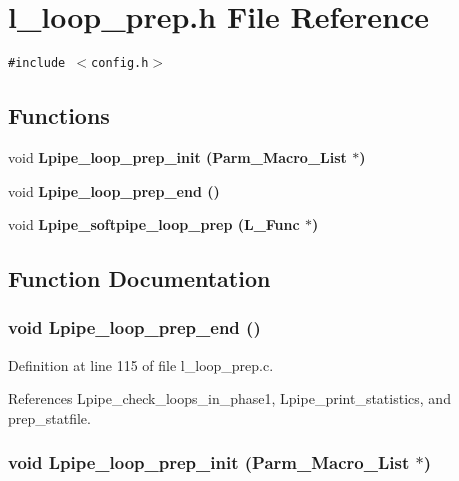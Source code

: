 \section{l\_\-loop\_\-prep.h File Reference}
\label{l__loop__prep_8h}
{\tt \#include $<$config.h$>$}\par
\subsection*{Functions}
\begin{CompactItemize}
\item 
void \bf{Lpipe\_\-loop\_\-prep\_\-init} (Parm\_\-Macro\_\-List $\ast$)
\item 
void \bf{Lpipe\_\-loop\_\-prep\_\-end} ()
\item 
void \bf{Lpipe\_\-softpipe\_\-loop\_\-prep} (L\_\-Func $\ast$)
\end{CompactItemize}


\subsection{Function Documentation}
\subsubsection{\setlength{\rightskip}{0pt plus 5cm}void Lpipe\_\-loop\_\-prep\_\-end ()}\label{l__loop__prep_8h_bbe8166961529f868de1ab8ed3cd6ba3}




Definition at line 115 of file l\_\-loop\_\-prep.c.

References Lpipe\_\-check\_\-loops\_\-in\_\-phase1, Lpipe\_\-print\_\-statistics, and prep\_\-statfile.
\subsubsection{\setlength{\rightskip}{0pt plus 5cm}void Lpipe\_\-loop\_\-prep\_\-init (Parm\_\-Macro\_\-List $\ast$)}\label{l__loop__prep_8h_426d800c81ba417a208915c6d6949405}




